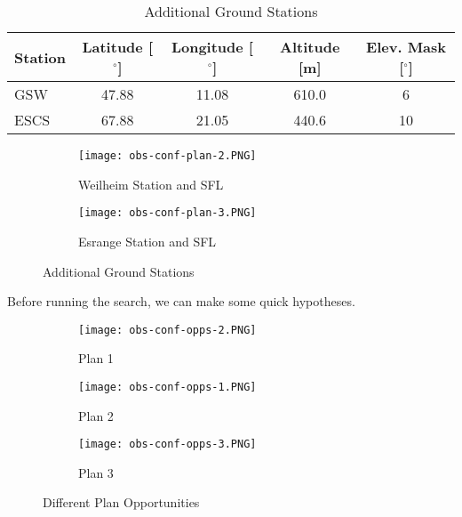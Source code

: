 \begin{table}[h] 
    \centering
    \caption{Additional Ground Stations}
    \begin{tabular}{ccccc}
	Station & Latitude [$^\circ$] & Longitude [$^\circ$] & Altitude [m] & Elev. Mask [$^\circ$] \\ \hline
	\multicolumn{1}{l|}{GSW}  & 47.88   & 11.08   & 610.0  & 6      \\
	\multicolumn{1}{l|}{ESCS} & 67.88   & 21.05   & 440.6  & 10      \\
    \end{tabular}
    \label{tab:additional-gs}
\end{table}

\begin{figure}[h]
    \centering
    \begin{subfigure}[b]{0.49\textwidth}
	\centering
	\texttt{[image: obs-conf-plan-2.PNG]} 
	\caption{Weilheim Station and SFL}
	\label{fig:obs-conf-gs-placements-1} 
    \end{subfigure}
    \hfill
    \begin{subfigure}[b]{0.49\textwidth}
	\centering
	\texttt{[image: obs-conf-plan-3.PNG]} 
	\caption{Esrange Station and SFL}
	\label{fig:obs-conf-gs-placements-2}
    \end{subfigure}
    \caption{Additional Ground Stations}
    \label{fig:obs-conf-gs-placements} 
\end{figure}

Before running the search, we can make some quick hypotheses.

\begin{figure}[h]
    \centering
    \begin{subfigure}[b]{0.3\textwidth}
	\centering
	\texttt{[image: obs-conf-opps-2.PNG]} 
	\caption{Plan 1}
	\label{fig:obs-conf-opps-1} 
    \end{subfigure}
    \hfill
    \begin{subfigure}[b]{0.3\textwidth}
	\centering
	\texttt{[image: obs-conf-opps-1.PNG]} 
	\caption{Plan 2}
	\label{fig:obs-conf-opps-2} 
    \end{subfigure}
    \hfill
    \begin{subfigure}[b]{0.3\textwidth}
	\centering
	\texttt{[image: obs-conf-opps-3.PNG]} 
	\caption{Plan 3}
	\label{fig:obs-conf-opps-3} 
    \end{subfigure}

    \caption{Different Plan Opportunities}
    \label{fig:obs-conf-opps}
\end{figure}



